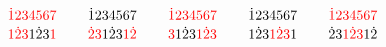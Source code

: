 \[ \SeqCompare{\textcolor{red}{\dot{1}}\textcolor{red}{2}\textcolor{red}{3}\textcolor{red}{4}\textcolor{red}{5}\textcolor{red}{6}\textcolor{red}{7}}{\textcolor{red}{1}\textcolor{red}{\dot{2}}\textcolor{red}{3}1\dot{2}3\textcolor{red}{1}}
\qquad
\SeqCompare{\dot{1}234567}{\textcolor{red}{\dot{2}}\textcolor{red}{3}1\dot{2}3\textcolor{red}{1}\textcolor{red}{\dot{2}}}
\qquad
\SeqCompare{\textcolor{red}{\dot{1}}\textcolor{red}{2}\textcolor{red}{3}\textcolor{red}{4}\textcolor{red}{5}\textcolor{red}{6}\textcolor{red}{7}}{\textcolor{red}{3}1\dot{2}3\textcolor{red}{1}\textcolor{red}{\dot{2}}\textcolor{red}{3}}
\qquad
\SeqCompare{\dot{1}234567}{1\dot{2}3\textcolor{red}{1}\textcolor{red}{\dot{2}}\textcolor{red}{3}1}
\qquad
\SeqCompare{\textcolor{red}{\dot{1}}\textcolor{red}{2}\textcolor{red}{3}\textcolor{red}{4}\textcolor{red}{5}\textcolor{red}{6}\textcolor{red}{7}}{\dot{2}3\textcolor{red}{1}\textcolor{red}{\dot{2}}\textcolor{red}{3}1\dot{2}} \]